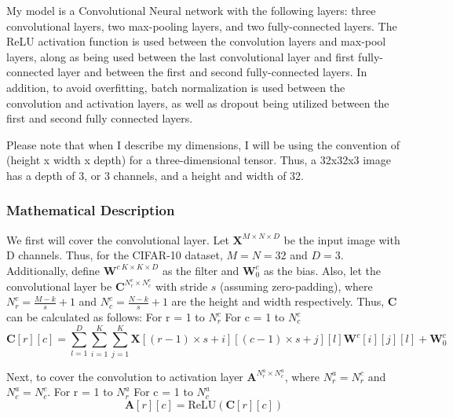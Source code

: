 \documentclass{article}
\begin{document}
My model is a Convolutional Neural network with the following layers: three convolutional layers, two max-pooling layers, and two fully-connected layers. The ReLU activation function is used between the convolution layers and max-pool layers, along as being used between the last convolutional layer and first fully-connected layer and between the first and second fully-connected layers. In addition, to avoid overfitting, batch normalization is used between the convolution and activation layers, as well as dropout being utilized between the first and second fully connected layers.

Please note that when I describe my dimensions, I will be using the  convention of (height x width x depth) for a three-dimensional tensor. Thus, a 32x32x3 image has a depth of 3, or 3 channels, and a height and width of 32.

\subsubsection{Mathematical Description}
\label{subsubsec:cnn_math}

We first will cover the convolutional layer. Let $\textbf{X}^{M \times N \times D}$ be the input image with D channels. Thus, for the CIFAR-10 dataset, $M = N = 32$ and $D=3$. Additionally, define $\textbf{W}^{c ~ K \times K \times D}$ as the filter and $\textbf{W}_0^c$ as the bias. Also, let the convolutional layer be $\textbf{C}^{N^c_r \times N^c_c}$ with stride $s$ (assuming zero-padding), where $N^c_r = \frac{M-k}{s}+1$ and $N^c_c = \frac{N-k}{s}+1$ are the height and width respectively. Thus, $\textbf{C}$ can be calculated as follows:\newline
\noindent For r = 1 to $N^c_r$ \newline
\noindent For c = 1 to $N^c_c$ \newline
\begin{equation*}
    \textbf{C}[r][c] = \sum_{l=1}^{D} \sum_{i=1}^{K} \sum_{j=1}^{K} \textbf{X}[(r-1) \times s + i][(c-1) \times s + j][l]\textbf{W}^{c}[i][j][l] + \textbf{W}_{0}^{c}
\end{equation*}

Next, to cover the convolution to activation layer $\textbf{A}^{N^a_r \times N^a_c}$, where $N^a_r=N^c_r$ and $N^a_c=N^c_c$. \newline
\noindent For r = 1 to $N^a_r$ \newline
\noindent For c = 1 to $N^a_c$ \newline
\begin{equation*}
    \textbf{A}[r][c] = \text{ReLU}(\textbf{C}[r][c])
\end{equation*}
\end{document}
